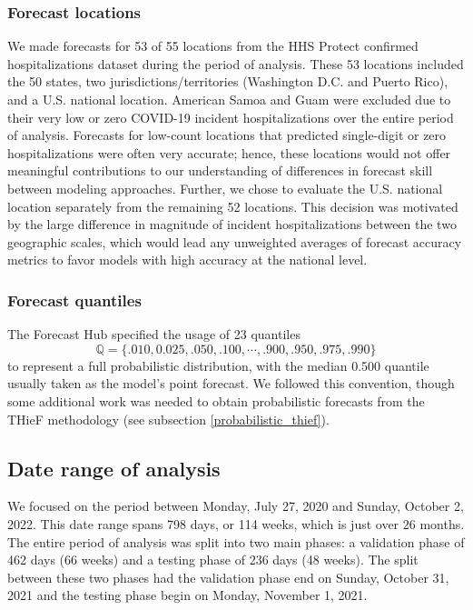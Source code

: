 \documentclass[12pt]{article}
\begin{document}
\subsubsection{Forecast locations} \label{forecast_locations}
We made forecasts for 53 of 55 locations from the HHS Protect confirmed hospitalizations dataset during the period of analysis. These 53 locations included the 50 states, two jurisdictions/territories (Washington D.C. and Puerto Rico), and a U.S. national location. American Samoa and Guam were excluded due to their very low or zero COVID-19 incident hospitalizations over the entire period of analysis. Forecasts for low-count locations that predicted single-digit or zero hospitalizations were often very accurate; hence, these locations would not offer meaningful contributions to our understanding of differences in forecast skill between modeling approaches\cite{cramer}. Further, we chose to evaluate the U.S. national location separately from the remaining 52 locations. This decision was motivated by the large difference in magnitude of incident hospitalizations between the two geographic scales, which would lead any unweighted averages of forecast accuracy metrics to favor models with high accuracy at the national level.

\subsubsection{Forecast quantiles} \label{forecast_quantiles}
The Forecast Hub specified the usage of 23 quantiles \[\mathbb{Q} = \{.010, 0.025, .050, .100, \cdots, .900, .950, .975, .990\}\] to represent a full probabilistic distribution, with the median 0.500 quantile usually taken as the model's point forecast. We followed this convention, though some additional work was needed to obtain probabilistic forecasts from the THieF methodology (see subsection \ref{probabilistic_thief}).

\subsection{Date range of analysis} \label{date_range}
We focused on the period between Monday, July 27, 2020 and Sunday, October 2, 2022. This date range spans 798 days, or 114 weeks, which is just over 26 months. The entire period of analysis was split into two main phases: a validation phase of 462 days (66 weeks) and a testing phase of 236 days (48 weeks). The split between these two phases had the validation phase end on Sunday, October 31, 2021 and the testing phase begin on Monday, November 1, 2021.
\end{document}
